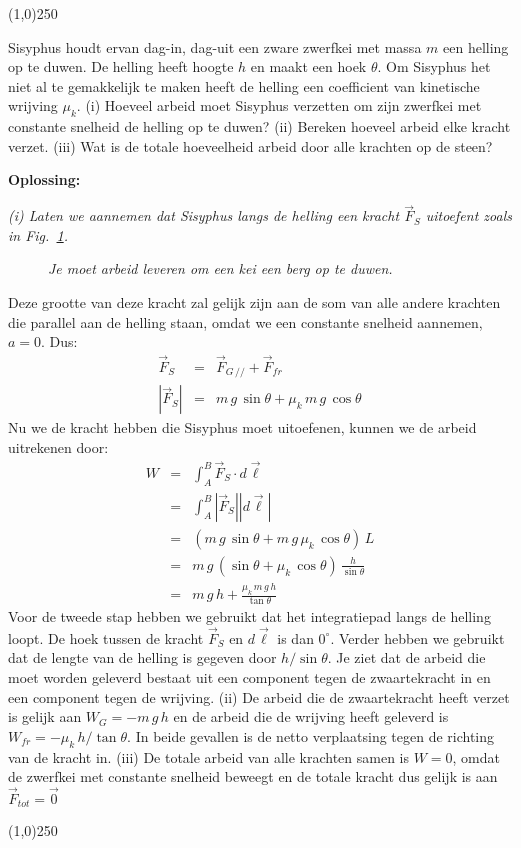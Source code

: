 \begin{center}
\line(1,0){250}
\end{center}
\begin{voorbeeld} 
Sisyphus houdt ervan dag-in, dag-uit een zware zwerfkei met massa $m$ een helling 
op te duwen. De helling heeft hoogte $h$ en maakt een hoek $\theta$. Om Sisyphus
het niet al te gemakkelijk te maken heeft de helling een coefficient van kinetische
wrijving $\mu_k$.  (i) Hoeveel arbeid moet Sisyphus verzetten om zijn zwerfkei met 
constante snelheid de helling op te duwen? (ii) Bereken hoeveel arbeid elke kracht verzet.
(iii) Wat is de totale hoeveelheid arbeid door alle krachten op de steen?

{\bf Oplossing: }{\it (i) Laten we aannemen dat Sisyphus langs de helling een kracht $\vec{F}_S$ 
uitoefent zoals in Fig.~\ref{fig:sisyphus}. 
 \begin{figure}[htbp]
\begin{center}
\caption{{\it Je moet arbeid leveren om een kei een berg op te duwen.}}
\label{fig:sisyphus}
\end{center}
\end{figure} 
Deze grootte van deze kracht zal gelijk zijn aan de som van alle andere krachten
die parallel aan de helling staan, omdat we een constante snelheid aannemen, $a=0$. Dus:
\begin{eqnarray}
\vec{F}_S & = & \vec{F}_{G\,//}+\vec{F}_{fr} \\
 |\vec{F}_S|  & = & m\,g\,\sin\theta + \mu_k\,m\,g\,\cos\theta 
\end{eqnarray}
Nu we de kracht hebben die Sisyphus moet uitoefenen, kunnen we de arbeid uitrekenen door:
\begin{eqnarray}
W & = & \int_A^B \vec{F}_S \cdot d\vec{\ell} \\
     & = & \int_A^B |\vec{F}_S| |d\vec{\ell}| \\
     & = & (m\,g\,\sin\theta + m\,g\,\mu_k\,\cos\theta)\,L \\
     & = & m\,g\, (\sin\theta + \mu_k\,\cos\theta)\,\frac{h}{\sin\theta} \\
     & = & m\,g\,h + \frac{\mu_k \,m\,g\, h}{\tan\theta}
\end{eqnarray} 
Voor de tweede stap hebben we gebruikt dat het integratiepad langs de helling loopt. De
hoek tussen de kracht $\vec{F}_S$ en $d\vec{\ell}$ is dan $0^{\circ}$. Verder hebben we gebruikt
dat de lengte van de helling is gegeven door $h / \sin\theta$. Je ziet dat de arbeid die
moet worden geleverd bestaat uit een component tegen de zwaartekracht in en een component
tegen de wrijving. (ii) De arbeid die de zwaartekracht heeft verzet is gelijk aan $W_G=-m\,g\,h$ en
de arbeid die de wrijving heeft geleverd is $W_{fr}=-\mu_k \, h / \tan\theta$. In beide gevallen
is de netto verplaatsing tegen de richting van de kracht in. (iii) De totale arbeid van alle
krachten samen is $W=0$, omdat de zwerfkei met constante snelheid beweegt en de totale
kracht dus gelijk is aan $\vec{F}_{tot}=\vec{0}$
}
\end{voorbeeld}
\begin{center}
\line(1,0){250}
\end{center}

